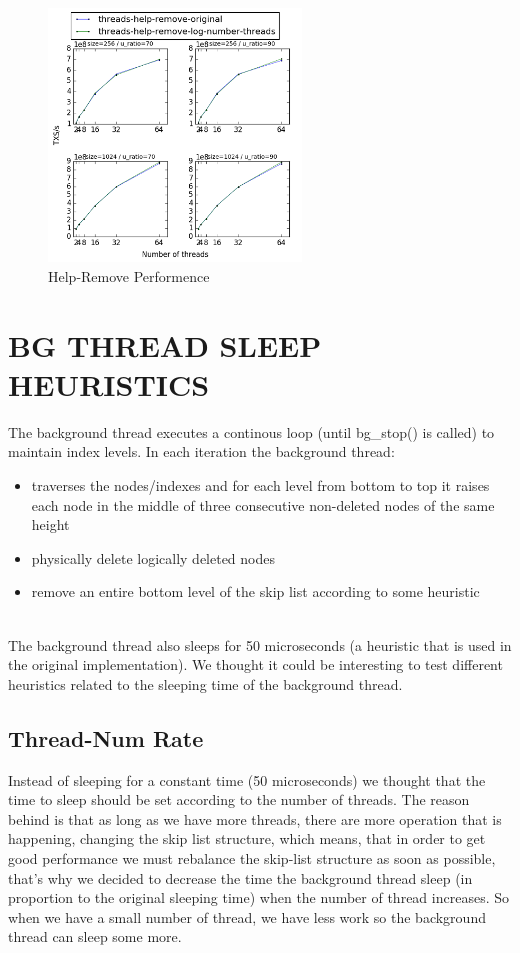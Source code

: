 \documentclass{article}
\begin{document}
\begin{figure}
	\caption{Help-Remove Performence}
	\centering
	\includegraphics[width=0.6\textwidth]{help-remove_plot}
\end{figure}

\section{BG THREAD SLEEP HEURISTICS}
\label{sec:bts}

The background thread executes a continous loop (until bg\_stop() is called) to maintain index levels. In each iteration the background thread:
\begin{itemize}
	\item traverses the nodes/indexes and for each level from bottom to top it raises each node in the middle of three consecutive non-deleted nodes of the same height 
	\item physically delete logically deleted nodes
	\item remove an entire bottom level of the skip list according to some heuristic
\end{itemize}
\\
The background thread also sleeps for 50 microseconds (a heuristic that is used in the original implementation). We thought it could be interesting to test different heuristics related to the sleeping time of the background thread.


\subsection{Thread-Num Rate}
\label{ssec:dsrs1}

Instead of sleeping for a constant time (50 microseconds) we thought that the time to sleep should be set according to the number of threads. The reason behind is that as long as we have more threads, there are more operation that is happening, changing the skip list structure, which means, that in order to get good performance we must rebalance the skip-list structure as soon as possible, that's why we decided to decrease the time the background thread sleep (in proportion to the original sleeping time) when the number of thread increases. So when we have a small number of thread, we have less work so the background thread can sleep some more.
\end{document}
